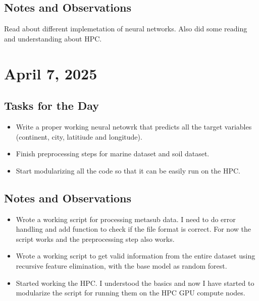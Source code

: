 \documentclass{article}
\begin{document}
\subsection*{Notes and Observations}
Read about different implemetation of neural networks. Also did some reading and understanding about HPC.

\section{April 7, 2025}

\subsection*{Tasks for the Day}
\begin{itemize}
    \item Write a proper working neural netowrk that predicts all the target variables (continent, city, latitiude and longitude).
    \item Finish preprocessing steps for marine dataset and soil dataset.
    \item Start modularizing all the code so that it can be easily run on the HPC.
\end{itemize}

\subsection*{Notes and Observations}
\begin{itemize}
    \item Wrote a working script for processing metasub data. I need to do error handling and add function to check if the file format is correct. For now the script works and the preprocessing step also works.
    \item Wrote a working script to get valid information from the entire dataset using recursive feature elimination, with the base model as random forest.
    \item Started working the HPC. I understood the basics and now I have started to modularize the script for running them on the HPC GPU compute nodes.
\end{itemize}
\end{document}
